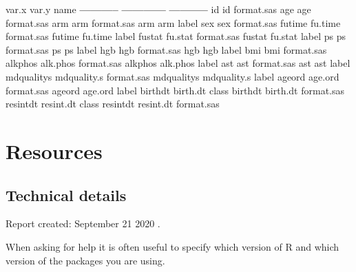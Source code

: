 \documentclass[
]{book}
\newenvironment{Shaded}{\begin{snugshade}}{\end{snugshade}}
\newcommand{\NormalTok}[1]{#1}
\newcommand{\OperatorTok}[1]{\textcolor[rgb]{0.81,0.36,0.00}{\textbf{#1}}}
\newcommand{\StringTok}[1]{\textcolor[rgb]{0.31,0.60,0.02}{#1}}
\begin{document}
\begin{Shaded}
\begin{Highlighting}[]
\NormalTok{var.x        var.y         name       }
\OperatorTok{-----------}\StringTok{  }\OperatorTok{------------}\StringTok{  }\OperatorTok{-----------}
\NormalTok{id           id            format.sas }
\NormalTok{age          age           format.sas }
\NormalTok{arm          arm           format.sas }
\NormalTok{arm          arm           label      }
\NormalTok{sex          sex           format.sas }
\NormalTok{futime       fu.time       format.sas }
\NormalTok{futime       fu.time       label      }
\NormalTok{fustat       fu.stat       format.sas }
\NormalTok{fustat       fu.stat       label      }
\NormalTok{ps           ps            format.sas }
\NormalTok{ps           ps            label      }
\NormalTok{hgb          hgb           format.sas }
\NormalTok{hgb          hgb           label      }
\NormalTok{bmi          bmi           format.sas }
\NormalTok{alkphos      alk.phos      format.sas }
\NormalTok{alkphos      alk.phos      label      }
\NormalTok{ast          ast           format.sas }
\NormalTok{ast          ast           label      }
\NormalTok{mdqualitys   mdquality.s   format.sas }
\NormalTok{mdqualitys   mdquality.s   label      }
\NormalTok{ageord       age.ord       format.sas }
\NormalTok{ageord       age.ord       label      }
\NormalTok{birthdt      birth.dt      class      }
\NormalTok{birthdt      birth.dt      format.sas }
\NormalTok{resintdt     resint.dt     class      }
\NormalTok{resintdt     resint.dt     format.sas }
\end{Highlighting}
\end{Shaded}

\hypertarget{resources}{%
\section{Resources}\label{resources}}

\hypertarget{technical-details}{%
\subsection{Technical details}\label{technical-details}}

Report created: September 21 2020 .

When asking for help it is often useful to specify which version of R and which version of the packages you are using.
\end{document}
